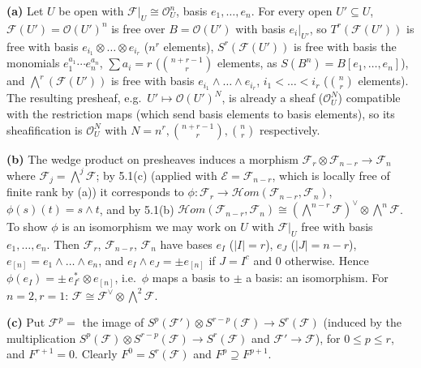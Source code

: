 \documentclass[11pt]{article}
\begin{document}
\textbf{(a)} Let $U$ be open with $\mathcal F|_U\cong\mathcal O_U^n$, basis $e_1,\dots,e_n$. For every open $U'\subseteq U$, $\mathcal F(U')=\mathcal O(U')^n$ is free over $B=\mathcal O(U')$ with basis $e_i|_{U'}$, so $T^r(\mathcal F(U'))$ is free with basis $e_{i_1}\otimes\dots\otimes e_{i_r}$ ($n^r$ elements), $S^r(\mathcal F(U'))$ is free with basis the monomials $e_1^{a_1}\cdots e_n^{a_n}$, $\sum a_i=r$ ($\binom{n+r-1}{r}$ elements, as $S(B^n)=B[e_1,\dots,e_n]$), and $\bigwedge^r(\mathcal F(U'))$ is free with basis $e_{i_1}\wedge\dots\wedge e_{i_r}$, $i_1<\dots<i_r$ ($\binom nr$ elements). The resulting presheaf, e.g.\ $U'\mapsto\mathcal O(U')^{N}$, is already a sheaf ($\mathcal O_U^N$) compatible with the restriction maps (which send basis elements to basis elements), so its sheafification is $\mathcal O_U^N$ with $N=n^r,\binom{n+r-1}r,\binom nr$ respectively.

\textbf{(b)} The wedge product on presheaves induces a morphism $\mathcal F_r\otimes\mathcal F_{n-r}\to\mathcal F_n$ where $\mathcal F_j=\bigwedge^j\mathcal F$; by 5.1(c) (applied with $\mathcal E=\mathcal F_{n-r}$, which is locally free of finite rank by (a)) it corresponds to $\phi:\mathcal F_r\to\mathcal{H}om(\mathcal F_{n-r},\mathcal F_n)$, $\phi(s)(t)=s\wedge t$, and by 5.1(b) $\mathcal{H}om(\mathcal F_{n-r},\mathcal F_n)\cong(\bigwedge^{n-r}\mathcal F)^\vee\otimes\bigwedge^n\mathcal F$. To show $\phi$ is an isomorphism we may work on $U$ with $\mathcal F|_U$ free with basis $e_1,\dots,e_n$. Then $\mathcal F_r$, $\mathcal F_{n-r}$, $\mathcal F_n$ have bases $e_I$ ($|I|=r$), $e_J$ ($|J|=n-r$), $e_{[n]}=e_1\wedge\dots\wedge e_n$, and $e_I\wedge e_J=\pm e_{[n]}$ if $J=I^c$ and $0$ otherwise. Hence $\phi(e_I)=\pm\,e_{I^c}^*\otimes e_{[n]}$, i.e.\ $\phi$ maps a basis to $\pm$ a basis: an isomorphism. For $n=2,r=1$: $\mathcal F\cong\mathcal F^\vee\otimes\bigwedge^2\mathcal F$.

\textbf{(c)} Put $\mathcal F^p=$ the image of $S^p(\mathcal F')\otimes S^{r-p}(\mathcal F)\to S^r(\mathcal F)$ (induced by the multiplication $S^p(\mathcal F)\otimes S^{r-p}(\mathcal F)\to S^r(\mathcal F)$ and $\mathcal F'\to\mathcal F$), for $0\le p\le r$, and $F^{r+1}=0$. Clearly $F^0=S^r(\mathcal F)$ and $F^p\supseteq F^{p+1}$.
\end{document}
